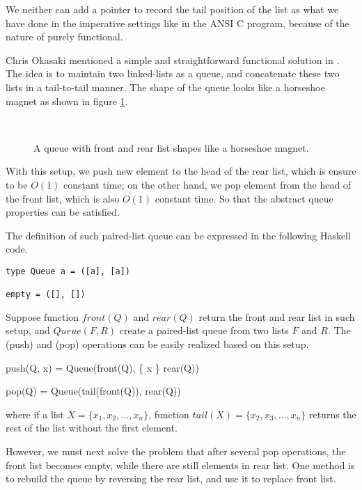 \documentclass{article}
\begin{document}
We neither can add a pointer to record the tail position of the list
as what we have done in the imperative settings like in the ANSI C program,
because of the nature of purely functional.

Chris Okasaki mentioned a simple and straightforward functional solution
in \cite{okasaki-book}. The idea is to maintain two linked-lists as a queue,
and concatenate these two lists in a tail-to-tail manner. The shape of the queue
looks like a horseshoe magnet as shown in figure \ref{fig:horseshoe-magnet}.

\begin{figure}[htbp]
  \centering
   \\
  \caption{A queue with front and rear list shapes like a horseshoe magnet.} \label{fig:horseshoe-magnet}
\end{figure}

With this setup, we push new element to the head of the rear list, which is
ensure to be $O(1)$ constant time; on the other hand, we pop element from
the head of the front list, which is also $O(1)$ constant time.
So that the abstract queue properties can be satisfied.

The definition of such paired-list queue can be expressed in the following
Haskell code.

\lstset{language=Haskell}
\begin{lstlisting}
type Queue a = ([a], [a])

empty = ([], [])
\end{lstlisting}

Suppose function $front(Q)$ and $rear(Q)$ return the front and rear
list in such setup, and $Queue(F, R)$ create a paired-list queue from
two lists $F$ and $R$.
The  (push) and  (pop) operations can
be easily realized based on this setup.

\be
push(Q, x) = Queue(front(Q), \{ x \} \cup rear(Q))
\ee

\be
pop(Q) = Queue(tail(front(Q)), rear(Q))
\ee

where if a list $X =  \{ x_1, x_2, ..., x_n \}$,
function $tail(X) = \{ x_2, x_3, ..., x_n \}$ returns the rest of the list
without the first element.

However, we must next solve the problem that after several pop operations,
the front
list becomes empty, while there are still elements in rear list. One method
is to rebuild the queue by reversing the rear list, and use it to replace front
list.
\end{document}
